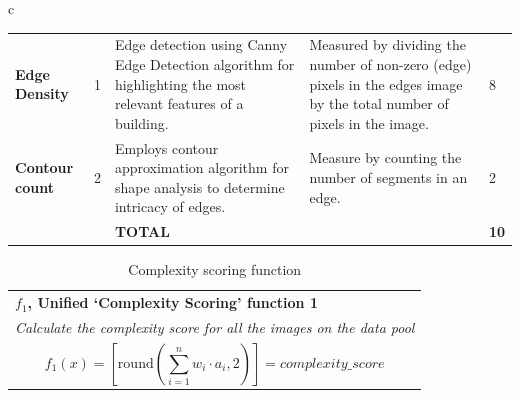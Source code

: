 \documentclass[final,5p,times]{elsarticle}%
\begin{document}
\begin{linenumbers}
\begin{table}[h!tb]
\begin{tabular}{c}
\begin{minipage}{\textwidth}
\begin{tabularx}{\textwidth}{p{3.5cm} p{1cm} X X p{1cm}}
                            \textbf{Edge Density} &
                              1 &
                              Edge detection using Canny Edge Detection algorithm for highlighting the most relevant features of a building.
                                &
                              Measured by dividing the number of non-zero (edge) pixels in the edges image by the total number of pixels in the image.
                                &
                              8\\
                            \textbf{Contour count} &
                              2 &
                              Employs contour approximation algorithm for shape analysis to determine intricacy of edges.
                                &
                              Measure by counting the number of segments in an edge.
                                &
                              2\\ \bottomrule
                               &
                               &
                              \textbf{TOTAL} &
                              &
                              \textbf{10}\\ \bottomrule
                        \end{tabularx}
                    \end{minipage}
                \end{tabular}
            \end{table}

            \begin{table}[htb]
                \caption{Complexity scoring function }
                \label{tab:ComplexityScoreFunction_table}
                \centering
                \small
                \begin{tabular}{|p{8cm}|}
                \hline
                    \textbf{\(f_1\), Unified `Complexity Scoring' function 1}\\
                    \textit{Calculate the complexity score for all the images on the data pool}
                    \\
                    \begin{equation}
                        f_1(x) = \left[ \mathrm{round}\left(\sum_{i=1}^{n} w_i \cdot a_i, 2\right) \right] = complexity\_score
                    \label{eq:F1_ComplexityScoreFunction}
                    \end{equation}


\end{tabular}
\end{table}
\end{linenumbers}
\end{document}
